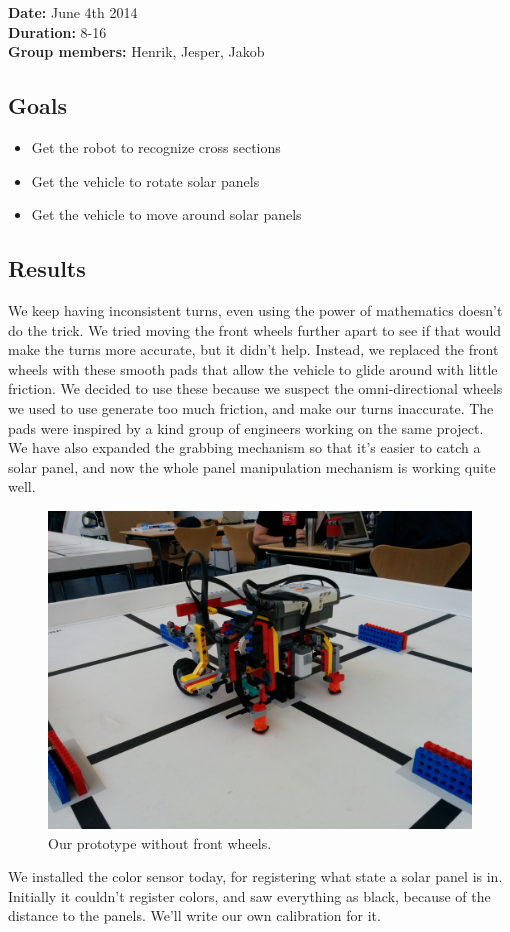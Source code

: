 \textbf{Date:} June 4th 2014\\\textbf{Duration:} 8-16\\\textbf{Group
members:} Henrik, Jesper, Jakob

\subsection{Goals}

\begin{itemize}
\itemsep1pt\parskip0pt
\item
  Get the robot to recognize cross sections
\item
  Get the vehicle to rotate solar panels
\item
  Get the vehicle to move around solar panels
\end{itemize}

\subsection{Results}

We keep having inconsistent turns, even using the power of mathematics
doesn't do the trick. We tried moving the front wheels further apart to
see if that would make the turns more accurate, but it didn't help.
Instead, we replaced the front wheels with these smooth pads that allow
the vehicle to glide around with little friction. We decided to use
these because we suspect the omni-directional wheels we used to use
generate too much friction, and make our turns inaccurate. The pads were
inspired by a kind group of engineers working on the same project.\\We
have also expanded the grabbing mechanism so that it's easier to catch a
solar panel, and now the whole panel manipulation mechanism is working
quite well.
\begin{figure}[hbt]
  \centering
  \includegraphics[scale=0.1]{../experiments/images/betterPrototype.jpg}
  \caption{Our prototype without front wheels.}
\end{figure}
We installed the color sensor today, for registering what state a solar
panel is in. Initially it couldn't register colors, and saw everything
as black, because of the distance to the panels. We'll write our own
calibration for it.

